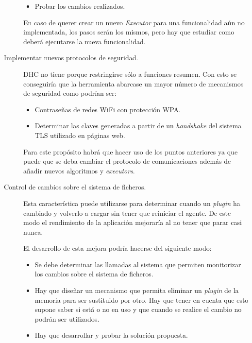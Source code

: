 \begin{description}
\begin{itemize}
			\item Probar los cambios realizados.
		\end{itemize}

		En caso de querer crear un nuevo \emph{Executor} para una funcionalidad aún no implementada, los pasos serán los mismos, pero hay que estudiar como deberá ejecutarse la nueva funcionalidad.

	\item[Implementar nuevos protocolos de seguridad.]

		DHC no tiene porque restringirse sólo a funciones resumen. Con esto se conseguiría que la herramienta abarcase un mayor número de mecanismos de seguridad como  podrían ser:

		\begin{itemize}
			\item Contraseñas de redes WiFi con protección WPA.

			\item Determinar las claves generadas a partir de un \emph{handshake} del sistema TLS utilizado en páginas web.
		\end{itemize}

		Para este propósito habrá que hacer uso de los puntos anteriores ya que puede que se deba cambiar el protocolo de comunicaciones además de añadir nuevos algoritmos y \emph{executors}.

	\item[Control de cambios sobre el sistema de ficheros.]

		Esta característica puede utilizarse para determinar cuando un \emph{plugin} ha cambiado y volverlo a cargar sin tener que reiniciar el agente. De este modo el rendimiento de la aplicación mejoraría al no tener que parar casi nunca.

		El desarrollo de esta mejora podría hacerse del siguiente modo:

		\begin{itemize}
			\item Se debe determinar las llamadas al sistema que permiten monitorizar los cambios sobre el sistema de ficheros.

			\item Hay que diseñar un mecanismo que permita eliminar un \emph{plugin} de la memoria para ser sustituido por otro. Hay que tener en cuenta que esto supone saber si está o no en uso y que cuando se realice el cambio no podrán ser utilizados.

			\item Hay que desarrollar y probar la solución propuesta.
		\end{itemize}


\end{description}
